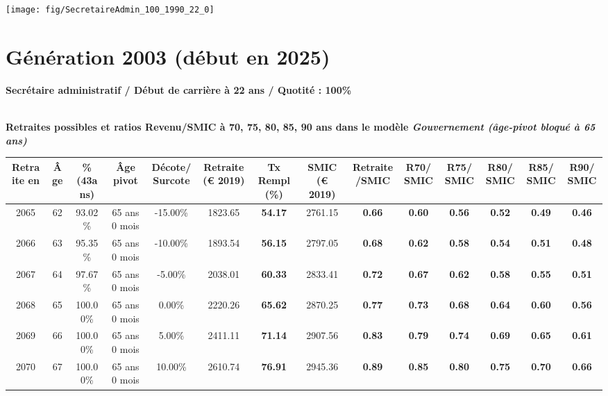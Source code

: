  {\hspace{-2.2cm}\texttt{[image: fig/SecretaireAdmin\_100\_1990\_22\_0]}} 

\newpage 
 
\section{Génération 2003 (début en 2025)\label{SecretaireAdmin_100_2003_22_0}} 
 
{\bf \noindent Secrétaire administratif / Début de carrière à 22 ans / Quotité : 100\%}  ~ 

 ~\\{\bf \noindent Retraites possibles et ratios Revenu/SMIC à 70, 75, 80, 85, 90 ans dans le modèle \emph{Gouvernement (âge-pivot bloqué à 65 ans)}}  
 
\begin{adjustbox}{max width=\textwidth} 
\begin{tabular}[htb]{|c|c||c|c|c||c|c||c|c||c|c|c|c|c|} 
\hline 
 Retraite en &  Âge &  \%(43ans) &  Âge pivot &  Décote/Surcote &  Retraite (\euro{} 2019) &  Tx Rempl(\%) &  SMIC (\euro{} 2019) &  Retraite/SMIC &  R70/SMIC &  R75/SMIC &  R80/SMIC &  R85/SMIC &  R90/SMIC \\ 
\hline \hline 
 2065 &  62 &  93.02\% &  65 ans 0 mois &  -15.00\% &  1823.65 &  {\bf 54.17} &  2761.15 &  {\bf {\color{red} 0.66}} &  {\bf {\color{red} 0.60}} &  {\bf {\color{red} 0.56}} &  {\bf {\color{red} 0.52}} &  {\bf {\color{red} 0.49}} &  {\bf {\color{red} 0.46}} \\ 
\hline 
 2066 &  63 &  95.35\% &  65 ans 0 mois &  -10.00\% &  1893.54 &  {\bf 56.15} &  2797.05 &  {\bf {\color{red} 0.68}} &  {\bf {\color{red} 0.62}} &  {\bf {\color{red} 0.58}} &  {\bf {\color{red} 0.54}} &  {\bf {\color{red} 0.51}} &  {\bf {\color{red} 0.48}} \\ 
\hline 
 2067 &  64 &  97.67\% &  65 ans 0 mois &  -5.00\% &  2038.01 &  {\bf 60.33} &  2833.41 &  {\bf {\color{red} 0.72}} &  {\bf {\color{red} 0.67}} &  {\bf {\color{red} 0.62}} &  {\bf {\color{red} 0.58}} &  {\bf {\color{red} 0.55}} &  {\bf {\color{red} 0.51}} \\ 
\hline 
 2068 &  65 &  100.00\% &  65 ans 0 mois &  0.00\% &  2220.26 &  {\bf 65.62} &  2870.25 &  {\bf {\color{red} 0.77}} &  {\bf {\color{red} 0.73}} &  {\bf {\color{red} 0.68}} &  {\bf {\color{red} 0.64}} &  {\bf {\color{red} 0.60}} &  {\bf {\color{red} 0.56}} \\ 
\hline 
 2069 &  66 &  100.00\% &  65 ans 0 mois &  5.00\% &  2411.11 &  {\bf 71.14} &  2907.56 &  {\bf {\color{red} 0.83}} &  {\bf {\color{red} 0.79}} &  {\bf {\color{red} 0.74}} &  {\bf {\color{red} 0.69}} &  {\bf {\color{red} 0.65}} &  {\bf {\color{red} 0.61}} \\ 
\hline 
 2070 &  67 &  100.00\% &  65 ans 0 mois &  10.00\% &  2610.74 &  {\bf 76.91} &  2945.36 &  {\bf {\color{red} 0.89}} &  {\bf {\color{red} 0.85}} &  {\bf {\color{red} 0.80}} &  {\bf {\color{red} 0.75}} &  {\bf {\color{red} 0.70}} &  {\bf {\color{red} 0.66}} \\ 
\hline 
\hline 
\end{tabular} 
\end{adjustbox} 
 
